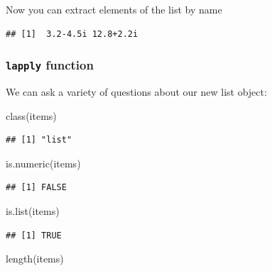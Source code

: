 \documentclass[
]{book}
\newenvironment{Shaded}{\begin{snugshade}}{\end{snugshade}}
\newcommand{\FunctionTok}[1]{\textcolor[rgb]{0.00,0.00,0.00}{#1}}
\newcommand{\NormalTok}[1]{#1}
\newcommand{\SpecialCharTok}[1]{\textcolor[rgb]{0.00,0.00,0.00}{#1}}
\begin{document}
Now you can extract elements of the list by name

\begin{Shaded}
\end{Shaded}

\begin{verbatim}
## [1]  3.2-4.5i 12.8+2.2i
\end{verbatim}

\hypertarget{lapply-function}{%
\subsubsection{\texorpdfstring{\texttt{lapply} function}{lapply function}}\label{lapply-function}}

We can ask a variety of questions about our new list object:

\begin{Shaded}
\begin{Highlighting}[]
\FunctionTok{class}\NormalTok{(items)}
\end{Highlighting}
\end{Shaded}

\begin{verbatim}
## [1] "list"
\end{verbatim}

\begin{Shaded}
\begin{Highlighting}[]
\FunctionTok{is.numeric}\NormalTok{(items)}
\end{Highlighting}
\end{Shaded}

\begin{verbatim}
## [1] FALSE
\end{verbatim}

\begin{Shaded}
\begin{Highlighting}[]
\FunctionTok{is.list}\NormalTok{(items)}
\end{Highlighting}
\end{Shaded}

\begin{verbatim}
## [1] TRUE
\end{verbatim}

\begin{Shaded}
\begin{Highlighting}[]
\FunctionTok{length}\NormalTok{(items)}
\end{Highlighting}
\end{Shaded}
\end{document}
